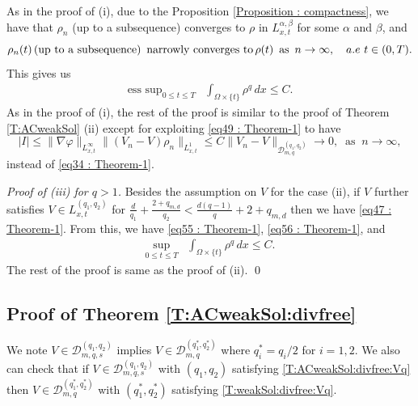 \documentclass{amsart}
\numberwithin{equation}{section}
\DeclareMathOperator*{\esssup}{ess \ sup}
\begin{document}
As in the proof of (i),  due to the Proposition \ref{Proposition : compactness},  we have that $\rho_n$ (up to a subsequence) converges to $\rho$ in $ L_{x,t}^{\alpha, \beta}$ for some $\alpha$ and $\beta$, and  
 \begin{equation*}\label{eq52 : Theorem-1}
\rho_n(t) \,\mbox{(up to a subsequence) \,narrowly converges to}\, \rho(t) \,~\mbox{as}~ \, n \rightarrow \infty, \quad a.e ~ t \in (0,T).
\end{equation*}
 This gives us
 \begin{equation*}
\begin{aligned}
\esssup_{0\leq t \leq T} &\int_{\Omega\times \{t\}}  \rho^q   \,dx \leq C.
\end{aligned}
\end{equation*}
As in the proof of (i), the rest of the proof is similar to the proof of Theorem \ref{T:ACweakSol} (ii) except for exploiting  \eqref{eq49 : Theorem-1} to have
\begin{equation*}
| I |\leq \|\nabla \varphi \|_{L_{x,t}^\infty} \|(V_n - V)\rho_n \|_{L_{x,t}^{1}}
\leq C \|V_n - V \|_{\mathcal{D}_{m,q}^{(q_1,q_2)}} \longrightarrow 0,  \  \mbox{ as } \   n\rightarrow \infty,
\end{equation*}
instead of  \eqref{eq34 : Theorem-1}.


{\it Proof of (iii) for $q>1$.}   Besides the assumption on $V$ for the case (ii), if  $V$ further satisfies $V\in L_{x,t}^{(q_1, q_2)}$ for $\frac{d}{q_1}+\frac{2+q_{m,d}}{q_2}< \frac{d(q-1)}{q} + 2+ q_{m,d} $ then we have \eqref{eq47 : Theorem-1}. From this, we have \eqref{eq55 : Theorem-1}, \eqref{eq56 : Theorem-1}, and
\begin{equation*}
\begin{aligned}
\sup_{0\leq t \leq T} &\int_{\Omega\times \{t\}}  \rho^q   \,dx \leq C.
\end{aligned}
\end{equation*}
The rest of the proof is same as the proof of (ii).
\qed


\subsection{Proof of Theorem \ref{T:ACweakSol:divfree}}
We note $V \in \mathcal{D}_{m,q,s}^{(q_1, q_2)}$ implies $V \in \mathcal{D}_{m,q}^{(q_1^*, q_2^*)}$ where $q_i^*=q_i/2$ for $i=1, 2$. We also can check that if 
$V \in \mathcal{D}_{m,q,s}^{(q_1, q_2)}$ with $(q_1, q_2)$ satisfying  \eqref{T:ACweakSol:divfree:Vq} then 
$V \in \mathcal{D}_{m,q}^{(q_1^*, q_2^*)}$ with $(q_1^*, q_2^*)$ satisfying \eqref{T:weakSol:divfree:Vq}.
\end{document}
